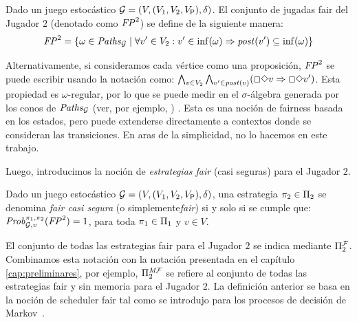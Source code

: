 \begin{definition}
Dado un juego estocástico $\mathcal{G} = (V, (V_1, V_2, V_{\mathsf{P}}), \delta)$.
El conjunto de jugadas fair del Jugador $2$ (denotado como $\mathit{FP}^2$) se define de la siguiente manera:
\[
	\mathit{FP}^2 = \{ \omega \in \mathit{Paths}_{\mathcal{G}} \mid \forall v' \in V_2: v' \in \inf(\omega)  \Rightarrow \mathit{post}(v') \subseteq \inf(\omega) \}
\]
\end{definition}
Alternativamente, si consideramos cada vértice como una proposición, $\mathit{FP}^2$ se puede escribir usando la notación {\LTL} como:
$\bigwedge_{v \in V_2} \bigwedge_{v' \in \mathit{post}(v)}(\Box \Diamond v \Rightarrow \Box \Diamond v')$. Esta propiedad es $\omega$-regular, por lo que se puede medir en el $\sigma$-álgebra generada por los conos de $\mathit{Paths}_{\mathcal{G}}$ (ver, por ejemplo, \cite[p.804]{BaierK08}) . Esta es una noción de fairness basada en los estados, pero puede extenderse directamente a contextos donde se consideran las transiciones. En aras de la simplicidad, no lo hacemos en este trabajo.
	

Luego, introducimos la noción de \emph{estrategias fair} (casi seguras) para el Jugador $2$.
\begin{definition} Dado un juego estocástico $\mathcal{G} = (V, (V_1, V_2, V_{\mathsf{P}}), \delta)$,
una estrategia $\pi_{2} \in \Pi_{2}$ se denomina \emph{fair casi segura} (o simplemente\emph{fair}) si y solo si se cumple que:
$\mathit{Prob}^{\pi_{1}, \pi_{2}}_{\mathcal{G},v}(\mathit{FP}^2) = 1$,
para toda $\pi_{1} \in \Pi_{1}$ y $v \in V$. 
\end{definition}
%
El conjunto de todas las estrategias fair para el Jugador $2$ se indica mediante $\Pi^{\mathcal{F}}_{2}$. Combinamos esta notación con la notación presentada en el capítulo \ref{cap:preliminares}, por ejemplo, $\Pi^{\textit{M}\mathcal{F}}_{2}$ se refiere al conjunto de todas las estrategias fair y sin memoria para el Jugador $2$.
%
La definición anterior se basa en la noción de scheduler fair tal como se introdujo para los procesos de decisión de Markov~\cite{DBLP:journals/dc/BaierK98,BaierK08}.

